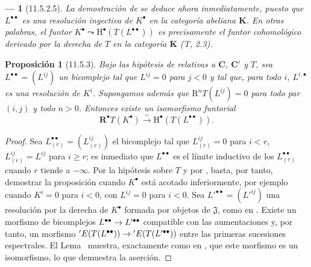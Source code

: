 \documentclass[10pt,oneside,openany]{book}
\theoremstyle{egaenv}\newtheorem*{env}{---}
\theoremstyle{egastatement}
\newtheorem*{proposition}{Proposición}
\theoremstyle{egadescription}
\renewcommand{\geq}{\geqslant}
\renewcommand{\to}{\mathchoice{\longrightarrow}{\rightarrow}{\rightarrow}{\rightarrow}}
\begin{document}
\begin{env}[11.5.2.5]
\label{0.11.5.2.5}
\label{0.11.5.2.5-fr}
La demostración de  se deduce ahora inmediatamente, puesto que $L^{\bullet\bullet}$ es una resolución inyectiva de $K^\bullet$ \emph{en la categoría abeliana $\boldsymbol{K}$}.
En otras palabras, el funtor
$K^\bullet\leadsto\mathrm H^\bullet(T(L^{\bullet\bullet}))$
es precisamente el funtor cohomológico \emph{derivado por la derecha} de $T$ en la categoría $\boldsymbol{K}$ (T, 2.3).
\end{env}

\begin{proposition}[11.5.3]
\label{0.11.5.3}
\label{0.11.5.3-fr}
Bajo las hipótesis de \textup{} relativas a $\boldsymbol{C}$, $\boldsymbol{C}'$ y $T$, sea $L^{\bullet\bullet}=(L^{ij})$ un bicomplejo tal que $L^{ij}=0$ para $j<0$ y tal que, para todo $i$, $L^{i,\bullet}$ es una resolución de $K^i$.
Supongamos además que $\mathrm R^nT(L^{ij})=0$ para todo par $(i,j)$ y todo $n>0$.
Entonces existe un isomorfismo funtorial
\[
  \label{0.11.5.3.1-fr}
  \mathbf R^\bullet T(K^\bullet)\xrightarrow{\sim}
  \mathrm H^\bullet(T(L^{\bullet\bullet})).
  \tag{11.5.3.1}
\]
\end{proposition}

\begin{proof}
Sea $L_{(r)}^{\bullet\bullet}=(L_{(r)}^{ij})$ el bicomplejo tal que $L_{(r)}^{ij}=0$ para $i<r$, $L_{(r)}^{ij}=L^{ij}$ para $i\geq r$; es inmediato que $L^{\bullet\bullet}$ es el límite inductivo de los $L_{(r)}^{\bullet\bullet}$ cuando $r$ tiende a $-\infty$.
Por la hipótesis sobre $T$ y por , basta, por tanto, demostrar la proposición cuando $K^\bullet$ está acotado inferiormente, por ejemplo cuando $K^i=0$ para $i<0$, con $L^{ij}=0$ para $i<0$.
Sea $L'^{\bullet\bullet}=(L'^{ij})$ una resolución por la derecha de $K^\bullet$ formada por objetos de $\mathfrak J$, como en .
Existe un morfismo de bicomplejos
$L^{\bullet\bullet}\to L'^{\bullet\bullet}$
compatible con las aumentaciones y, por tanto, un morfismo
$'E(T(L^{\bullet\bullet}))\to{}'E(T(L'^{\bullet\bullet}))$
entre las primeras sucesiones espectrales.
El Lema~ muestra, exactamente como en , que este morfismo es un isomorfismo, lo que demuestra la aserción.
\end{proof}
\end{document}
